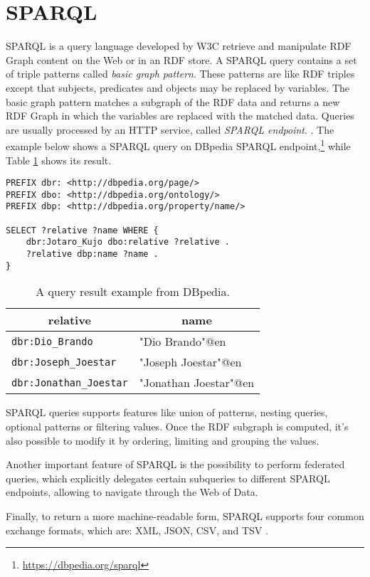 \section{SPARQL}
\label{sec:sparql}

\ac{SPARQL} is a query language developed by \ac{W3C} retrieve and manipulate \ac{RDF} Graph content on the Web or in an \ac{RDF} store. A \ac{SPARQL} query contains a set of triple patterns called \textit{basic graph pattern}. These patterns are like \ac{RDF} triples except that subjects, predicates and objects may be replaced by variables. The basic graph pattern matches a subgraph of the \ac{RDF} data and returns a new \ac{RDF} Graph in which the variables are replaced with the matched data. Queries are usually processed by an \ac{HTTP} service, called \textit{\ac{SPARQL} endpoint}. \cite{world2013sparql}. The example below shows a \ac{SPARQL} query on DBpedia \ac{SPARQL} endpoint,\footnote{\url{https://dbpedia.org/sparql}} while Table \ref{tab:sparql-example} shows its result.

\begin{verbatim}
PREFIX dbr: <http://dbpedia.org/page/>
PREFIX dbo: <http://dbpedia.org/ontology/>
PREFIX dbp: <http://dbpedia.org/property/name/>

SELECT ?relative ?name WHERE {
    dbr:Jotaro_Kujo dbo:relative ?relative .
    ?relative dbp:name ?name .
}
\end{verbatim}

\begin{table}[!ht]
    \centering
    \onehalfspacing
    \begin{tabular}{|l|l|}
        \hline
        \multicolumn{1}{|c|}{\textbf{relative}} & \multicolumn{1}{c|}{\textbf{name}} \\ \hline
        \verb#dbr:Dio_Brando# & "Dio Brando"@en \\ \hline
        \verb#dbr:Joseph_Joestar# & "Joseph Joestar"@en \\ \hline
        \verb#dbr:Jonathan_Joestar# & "Jonathan Joestar"@en \\ \hline
    \end{tabular}
    \caption{A query result example from DBpedia.}
    \label{tab:sparql-example}
\end{table}

\ac{SPARQL} queries supports features like union of patterns, nesting queries, optional patterns or filtering values. Once the \ac{RDF} subgraph is computed, it's also possible to modify it by ordering, limiting and grouping the values.

Another important feature of \ac{SPARQL} is the possibility to perform federated queries, which explicitly delegates certain subqueries to different \ac{SPARQL} endpoints, allowing to navigate through the Web of Data.

Finally, to return a more machine-readable form, \ac{SPARQL} supports four common exchange formats, which are: \ac{XML}, \ac{JSON}, \ac{CSV}, and \ac{TSV} \cite{world2013sparql}.